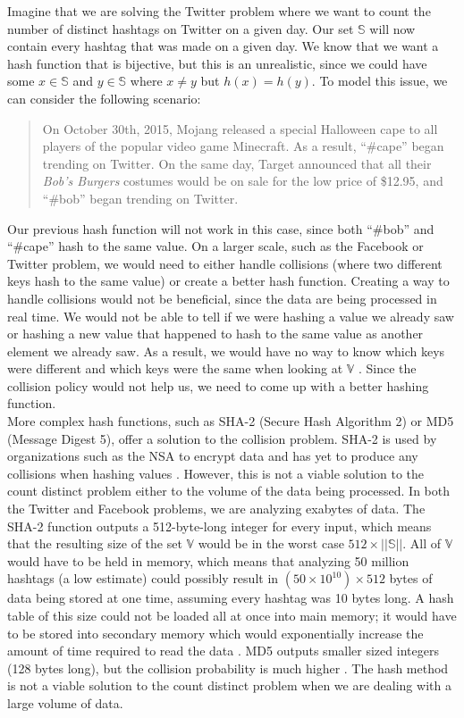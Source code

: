 \documentclass{article}
\begin{document}
\indent Imagine that we are solving the Twitter problem where we want to count the number of distinct hashtags on Twitter on a given day. 
Our set $\mathbb{S}$ will now contain every hashtag that was made on a given day. 
We know that we want a hash function that is bijective, but this is an unrealistic, since we could have some $x \in \mathbb{S}$ and $y\in\mathbb{S}$ where $x \neq y$ but $h(x) = h(y)$. 
To model this issue, we can consider the following scenario:
\begin{quote}
On October 30th, 2015, Mojang released a special Halloween cape to all players of the popular video game Minecraft. 
As a result, ``\#cape'' began trending on Twitter.
On the same day, Target announced that all their \textit{Bob's Burgers} costumes would be on sale for the low price of \$12.95, and ``\#bob'' began trending on Twitter.
\end{quote}
Our previous hash function will not work in this case, since both ``\#bob'' and ``\#cape'' hash to the same value. 
On a larger scale, such as the Facebook or Twitter problem, we would need to either handle collisions (where two different keys hash to the same value) or create a better hash function. 
Creating a way to handle collisions would not be beneficial, since the data are being processed in real time. 
We would not be able to tell if we were hashing a value we already saw or hashing a new value that happened to hash to the same value as another element we already saw. 
As a result, we would have no way to know which keys were different and which keys were the same when looking at $\mathbb{V}$ \cite[p. 6]{Maurer}. 
Since the collision policy would not help us, we need to come up with a better hashing function.\\

\indent More complex hash functions, such as SHA-2 (Secure Hash Algorithm 2) or MD5 (Message Digest 5), offer a solution to the collision problem. SHA-2 is used by organizations such as the NSA to encrypt data and has yet to produce any collisions when hashing values \cite[p. 301]{SHA-Algo}. However, this is not a viable solution to the count distinct problem either to the volume of the data being processed. In both the Twitter and Facebook problems, we are analyzing exabytes of data. The SHA-2 function outputs a 512-byte-long integer for every input, which means that the resulting size of the set $\mathbb{V}$ would be in the worst case $512 \times ||\mathbb{S}||$. All of $\mathbb{V}$ would have to be held in memory, which means that analyzing 50 million hashtags (a low estimate)\cite{Twitter} could possibly result in $(50 \times 10^{10}) \times 512$ bytes of data being stored at one time, assuming every hashtag was 10 bytes long. A hash table of this size could not be loaded all at once into main memory; it would have to be stored into secondary memory which would exponentially increase the amount of time required to read the data \cite[p. 209]{Whang}. MD5 outputs smaller sized integers (128 bytes long), but the collision probability is much higher \cite[p. 22 - 23]{Break-MD5}. The hash method is not a viable solution to the count distinct problem when we are dealing with a large volume of data.\\
\end{document}
